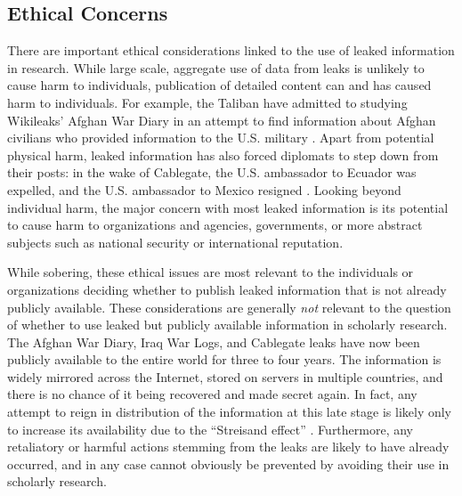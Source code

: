 \documentclass[12pt]{article}
\begin{document}
\subsection{Ethical Concerns}

There are important ethical considerations linked to the use of leaked information in research. 
While large scale, aggregate use of data from leaks is unlikely to cause harm to individuals, 
publication of detailed content can and has 
caused harm to individuals. For example, the Taliban have admitted to studying Wikileaks' 
Afghan War Diary in an attempt to find information about Afghan civilians who provided information 
to the U.S. military \citep{winnett2010wikileaks}. Apart from potential physical harm, 
leaked information 
has also forced diplomats to step down from their posts: in the wake of Cablegate, the 
U.S. ambassador to Ecuador was expelled, and the U.S. ambassador to Mexico 
resigned \citep{romero2011ecuador,associated_press2011us}. 
Looking beyond individual harm, the major concern with most leaked information is its potential to 
cause harm to organizations and agencies, governments, or more abstract subjects such as 
national security or international reputation.

While sobering, these ethical issues are most relevant to the individuals or organizations deciding 
whether to publish leaked 
information that is not already publicly available. These considerations are generally \emph{not} 
relevant 
to the question of whether to use leaked but publicly available information in scholarly research. 
The Afghan War Diary, Iraq 
War Logs, and Cablegate leaks have now been publicly available to the entire world for three to four 
years. The information is widely mirrored across the Internet, stored on servers in multiple countries, 
and there is no chance of it being 
recovered and made secret again. In fact, any attempt to reign in distribution of the information at this 
late stage is likely only to increase its availability due to the ``Streisand effect'' \citep{marton2010protecting}. 
Furthermore, any retaliatory or harmful actions stemming from the leaks are likely 
to have already occurred, and in any case cannot obviously be prevented by avoiding their use in scholarly 
research.
\end{document}
